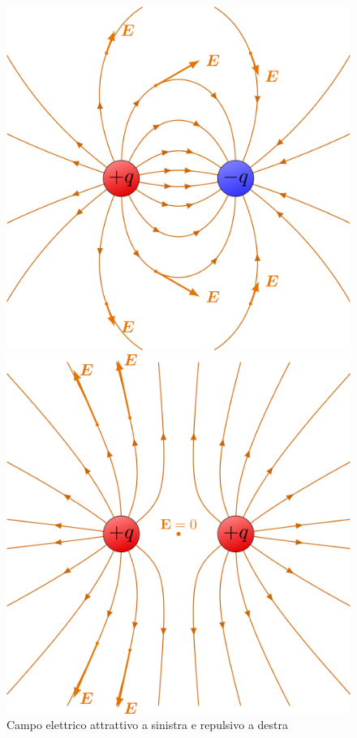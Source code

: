   \begin{figure}[H]
     \centering
     \begin{minipage}[c]{0.4\textwidth}
     \centering
            \includegraphics[width = 1\textwidth]{image/interazioneCampiElettrici.png}
      \end{minipage}
     \hspace{0.1mm}
     \begin{minipage}[c]{0.4\textwidth}
        \centering
        \includegraphics[width = 1\textwidth]{image/interazioniCampiElettrici2.png}
     \end{minipage}
     \caption{Campo elettrico attrattivo a sinistra e repulsivo a destra}
     \label{fig:campoElettricoAttrRep}
 \end{figure}
 
